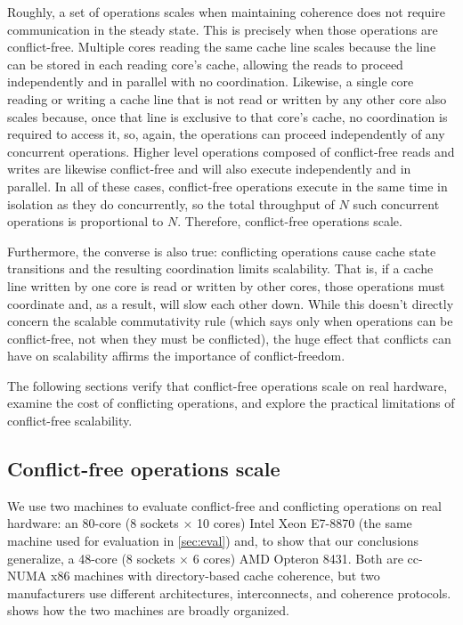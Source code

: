 Roughly, a set of operations scales when maintaining coherence does
not require communication in the steady state.  This is precisely when
those operations are conflict-free.  Multiple cores reading the same
cache line scales because the line can be stored in each reading
core's cache, allowing the reads to proceed independently and in
parallel with no coordination.  Likewise, a single core reading or
writing a cache line that is not read or written by any other core
also scales because, once that line is exclusive to that core's cache,
no coordination is required to access it, so, again, the operations
can proceed independently of any concurrent operations.
%
Higher level operations composed of conflict-free reads and writes are
likewise conflict-free and will also execute independently and in
parallel.
%
In all of these cases, conflict-free operations execute in the same
time in isolation as they do concurrently, so the total throughput of
$N$ such concurrent operations is proportional to $N$.  Therefore,
conflict-free operations scale.

Furthermore, the converse is also true: conflicting operations cause
cache state transitions and the resulting coordination limits
scalability.
%
That is, if a cache line written by one core is read or written by
other cores, those operations must
coordinate and, as a result, will slow each other down.  While this
doesn't directly concern the scalable commutativity rule (which says
only when operations can be conflict-free, not when they must be
conflicted), the huge effect that conflicts can have on scalability
affirms the importance of conflict-freedom.

The following sections verify that conflict-free operations scale on
real hardware, examine the cost of conflicting operations, and explore
the practical limitations of conflict-free scalability.


\subsection{Conflict-free operations scale}
\label{sec:scalability:conflict-free}

We use two machines to evaluate conflict-free and conflicting
operations on real hardware: an 80-core (8 sockets $\times$ 10 cores)
Intel Xeon E7-8870 (the same machine used for evaluation in
\cref{sec:eval}) and, to show that our conclusions generalize, a
48-core (8 sockets $\times$ 6 cores) AMD Opteron 8431.
%
Both are cc-NUMA x86 machines with directory-based cache coherence,
but two manufacturers use different architectures, interconnects, and
coherence protocols.
%
 shows how the
two machines are broadly organized.

